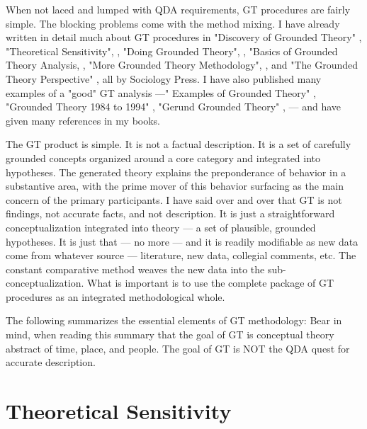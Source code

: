 When not laced and lumped with QDA requirements, GT procedures are fairly simple. 
The blocking problems come with the method mixing. 
I have already written in detail much about GT procedures in "Discovery of Grounded Theory"
\citep{book.glaser67},
"Theoretical Sensitivity", 
\citep{book.glaser78},
"Doing Grounded Theory", 
\citep{book.glaser98a},
"Basics of Grounded Theory Analysis, 
\citep{book.glaser92},
"More Grounded Theory Methodology", 
\citep{book.glaser94},
and 
"The Grounded Theory Perspective" 
\citep{book.glaser01},
 all by Sociology Press. 
I have also published many examples of a "good" GT analysis
---" Examples of Grounded Theory"
\citep{book.glaser93},
"Grounded Theory 1984 to 1994"
\citep{book.glaser95},
"Gerund Grounded Theory"
\citep{book.glaser98b},
--- and have given many references in my books.

The GT product is simple. 
It is not a factual description. 
It is a set of carefully grounded concepts organized around a core category and integrated into hypotheses. 
The generated theory explains the preponderance of behavior in a substantive area, with the prime mover of this behavior surfacing as the main concern of the primary participants. 
I have said over and over that GT is not findings, not accurate facts, and not description. 
It is just a straightforward conceptualization integrated into theory --- a set of plausible, grounded hypotheses. 
It is just that --- no more --- and it is readily modifiable as new data come from whatever source --- literature, new data, collegial comments, etc. 
The constant comparative method weaves the new data into the sub-conceptualization.
What is important is to use the complete package of GT procedures as an
integrated methodological whole.

The following summarizes the essential elements of GT methodology:
Bear in mind, when reading this summary that the goal of GT is conceptual theory abstract of time, place, and people. 
The goal of GT is NOT the QDA quest for accurate description.

\section*{Theoretical Sensitivity}

